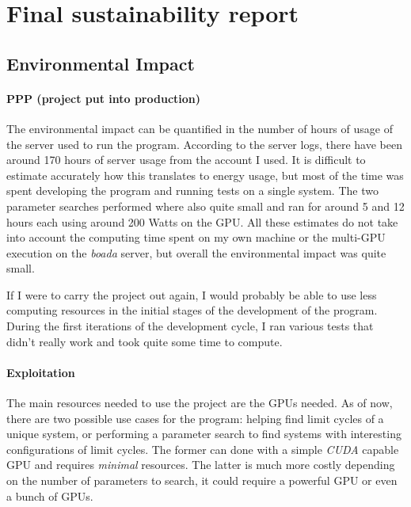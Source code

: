 
\section{Final sustainability report}
\label{sec:sustainability-final}

\subsection{Environmental Impact}

\paragraph{PPP (project put into production)}

The environmental impact can be quantified in the number of hours of usage of
the server used to run the program.  According to the server logs, there have
been around 170 hours of server usage from the account I used. It is difficult
to estimate accurately how this translates to energy usage, but most of the time
was spent developing the program and running tests on a single system. The two
parameter searches performed where also quite small and ran for around 5 and 12
hours each using around 200 Watts on the GPU. All these estimates do not take
into account the computing time spent on my own machine or the multi-GPU
execution on the \emph{boada} server, but overall the environmental impact was
quite small.

If I were to carry the project out again, I would probably be able to use less computing
resources in the initial stages of the development of the program. During the first
iterations of the development cycle, I ran various tests that didn't really work and
took quite some time to compute.

\paragraph{Exploitation}

The main resources needed to use the project are the GPUs needed. As of now, there are
two possible use cases for the program: helping find limit cycles of a unique
system, or performing a parameter search
to find systems with interesting configurations of limit cycles.
The former can done with a simple \emph{CUDA} capable GPU and requires \emph{minimal}
resources. The latter is much more costly depending on the number of parameters to search,
it could require a powerful GPU or even a bunch of GPUs.


